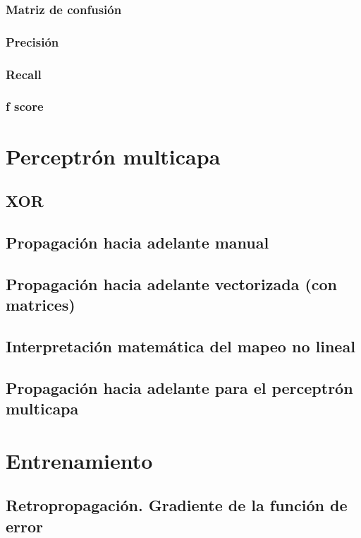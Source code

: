 \documentclass[12pt,openany]{book}
\begin{document}
\subsection{Matriz de confusión}
\subsection{Precisión}
\subsection{Recall}
\subsection{f score}


\chapter{Perceptrón multicapa}
\section{XOR}
\section{Propagación hacia adelante manual}
\section{Propagación hacia adelante vectorizada (con matrices)}
\section{Interpretación matemática del mapeo no lineal}
\section{Propagación hacia adelante para el perceptrón multicapa}


\chapter{Entrenamiento}
\section{Retropropagación. Gradiente de la función de error}
\end{document}
